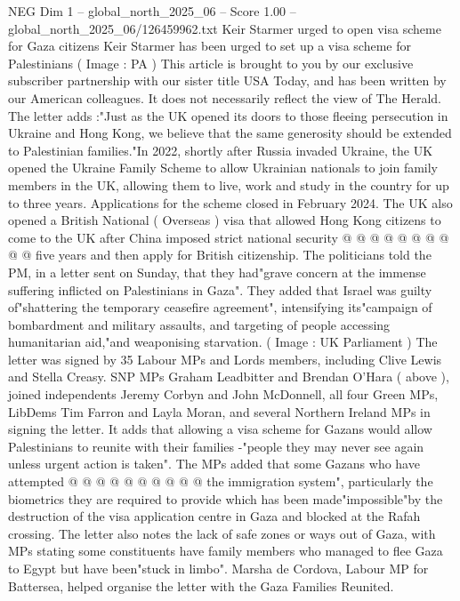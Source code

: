\begin{textsample}{NEG Dim 1 – global\_north\_2025\_06 – Score 1.00 – global\_north\_2025\_06/126459962.txt}  \label{ex:f1_neg_122}
Keir Starmer urged to open visa scheme for Gaza citizens Keir Starmer has been urged to set up a visa scheme for Palestinians ( Image : PA ) This article is brought to you by our exclusive subscriber partnership with our sister title USA Today, and has been written by our American colleagues.
It does not necessarily reflect the view of The Herald.
The letter adds :"Just as the UK opened its doors to those fleeing persecution in Ukraine and Hong Kong, we believe that the same generosity should be extended to Palestinian families."In 2022, shortly after Russia invaded Ukraine, the UK opened the Ukraine Family Scheme to allow Ukrainian nationals to join family members in the UK, allowing them to live, work and study in the country for up to three years.
Applications for the scheme closed in February 2024.
The UK also opened a British National ( Overseas ) visa that allowed Hong Kong citizens to come to the UK after China imposed strict national security @ @ @ @ @ @ @ @ @ @ five years and then apply for British citizenship.
The politicians told the PM, in a letter sent on Sunday, that they had"grave concern at the immense suffering inflicted on Palestinians in Gaza".
They added that Israel was guilty of"shattering the temporary ceasefire agreement", intensifying its"campaign of bombardment and military assaults, and targeting of people accessing humanitarian aid,"and weaponising starvation. ( Image : UK Parliament ) The letter was signed by 35 Labour MPs and Lords members, including Clive Lewis and Stella Creasy.
SNP MPs Graham Leadbitter and Brendan O'Hara ( above ), joined independents Jeremy Corbyn and John McDonnell, all four Green MPs, LibDems Tim Farron and Layla Moran, and several Northern Ireland MPs in signing the letter.
It adds that allowing a visa scheme for Gazans would allow Palestinians to reunite with their families -"people they may never see again unless urgent action is taken".
The MPs added that some Gazans who have attempted @ @ @ @ @ @ @ @ @ @ the immigration system", particularly the biometrics they are required to provide which has been made"impossible"by the destruction of the visa application centre in Gaza and blocked at the Rafah crossing.
The letter also notes the lack of safe zones or ways out of Gaza, with MPs stating some constituents have family members who managed to flee Gaza to Egypt but have been"stuck in limbo".
Marsha de Cordova, Labour MP for Battersea, helped organise the letter with the Gaza Families Reunited.

\end{textsample}
